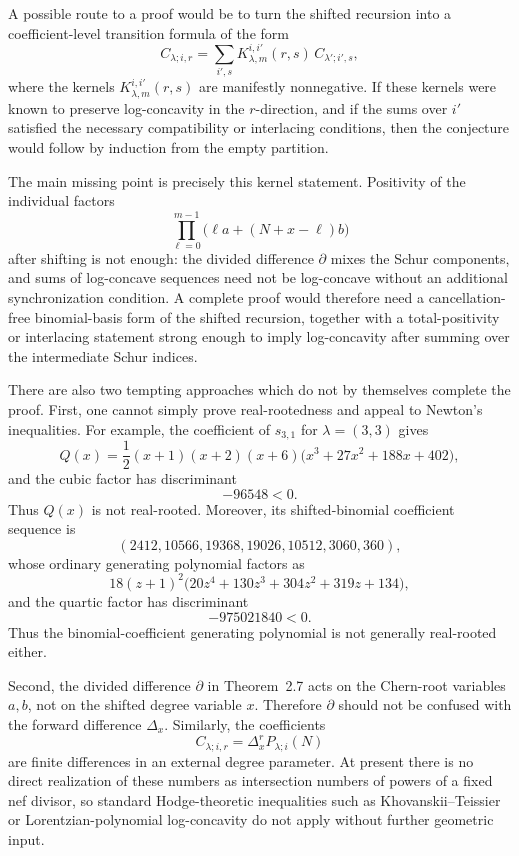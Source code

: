 \documentclass[11pt]{amsart}
\numberwithin{equation}{section}
\theoremstyle{remark}
\begin{document}
A possible route to a proof would be to turn the shifted recursion into a
coefficient-level transition formula of the form
\[
  C_{\lambda;i,r}
  =
  \sum_{i',s}
  K_{\lambda,m}^{i,i'}(r,s)\,
  C_{\lambda';i',s},
\]
where the kernels $K_{\lambda,m}^{i,i'}(r,s)$ are manifestly nonnegative.
If these kernels were known to preserve log-concavity in the $r$-direction,
and if the sums over $i'$ satisfied the necessary compatibility or
interlacing conditions, then the conjecture would follow by induction from
the empty partition.

The main missing point is precisely this kernel statement.  Positivity of
the individual factors
\[
  \prod_{\ell=0}^{m-1}\bigl(\ell a+(N+x-\ell)b\bigr)
\]
after shifting is not enough: the divided difference $\partial$ mixes the
Schur components, and sums of log-concave sequences need not be log-concave
without an additional synchronization condition.  A complete proof would
therefore need a cancellation-free binomial-basis form of the shifted
recursion, together with a total-positivity or interlacing statement strong
enough to imply log-concavity after summing over the intermediate Schur
indices.

There are also two tempting approaches which do not by themselves complete
the proof.  First, one cannot simply prove real-rootedness and appeal to
Newton's inequalities.  For example, the coefficient of $s_{3,1}$ for
$\lambda=(3,3)$ gives
\[
  Q(x)
  =
  \frac12(x+1)(x+2)(x+6)
  \bigl(x^3+27x^2+188x+402\bigr),
\]
and the cubic factor has discriminant
\[
  -96548<0.
\]
Thus $Q(x)$ is not real-rooted.  Moreover, its shifted-binomial
coefficient sequence is
\[
  (2412,10566,19368,19026,10512,3060,360),
\]
whose ordinary generating polynomial factors as
\[
  18(z+1)^2
  \bigl(20z^4+130z^3+304z^2+319z+134\bigr),
\]
and the quartic factor has discriminant
\[
  -975021840<0.
\]
Thus the binomial-coefficient generating polynomial is not generally
real-rooted either.

Second, the divided difference $\partial$ in Theorem~2.7 acts on the
Chern-root variables $a,b$, not on the shifted degree variable $x$.
Therefore $\partial$ should not be confused with the forward difference
$\Delta_x$.  Similarly, the coefficients
\[
  C_{\lambda;i,r}=\Delta_x^r P_{\lambda;i}(N)
\]
are finite differences in an external degree parameter.  At present there
is no direct realization of these numbers as intersection numbers of powers
of a fixed nef divisor, so standard Hodge-theoretic inequalities such as
Khovanskii--Teissier or Lorentzian-polynomial log-concavity do not apply
without further geometric input.
\end{document}
